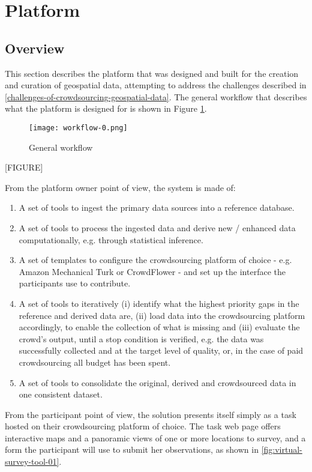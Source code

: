 \section{Platform}

\subsection{Overview}

This section describes the platform that was designed and built for the creation and curation of geospatial data, attempting to address the challenges described in \ref{challenges-of-crowdsourcing-geospatial-data}. The general workflow that describes what the platform is designed for is shown in Figure \ref{fig:workflow_0}.

\begin{figure}
	\texttt{[image: workflow-0.png]}
	\caption{General workflow}
	\label{fig:workflow_0}
\end{figure}

[FIGURE]

From the platform owner point of view, the system is made of:

\begin{enumerate}
    \item A set of tools to ingest the primary data sources into a reference database.
    \item A set of tools to process the ingested data and derive new / enhanced data computationally, e.g. through statistical inference.
    \item A set of templates to configure the crowdsourcing platform of choice - e.g. Amazon Mechanical Turk or CrowdFlower - and set up the interface the participants use to contribute.
    \item A set of tools to iteratively (i) identify what the highest priority gaps in the reference and derived data are, (ii) load data into the crowdsourcing platform accordingly, to enable the collection of what is missing and (iii) evaluate the crowd's output, until a stop condition is verified, e.g. the data was successfully collected and at the target level of quality, or, in the case of paid crowdsourcing all budget has been spent.
    \item A set of tools to consolidate the original, derived and crowdsourced data in one consistent dataset.
\end{enumerate}

From the participant point of view, the solution presents itself simply as a task hosted on their crowdsourcing platform of choice. The task web page offers interactive maps and a panoramic views of one or more locations to survey, and a form the participant will use to submit her observations, as shown in \ref{fig:virtual-survey-tool-01}. 

